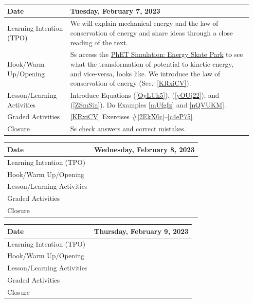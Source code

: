 \documentclass{article}
\numberwithin{equation}{section}
\numberwithin{figure}{section}
\begin{document}
\begin{tabular}{|m{}|m{}|}
    \hline  
    \cellcolor{black!20}\textbf{Date} &
    \cellcolor{black!20}\textbf{Tuesday, February 7, 2023} \\
    \hline
    Learning Intention (TPO) &  We will explain mechanical energy and the law of conservation of energy and share ideas through a close reading of the text.\\
    \hline
    Hook/Warm Up/Opening & Ss access the \href{https://phet.colorado.edu/en/simulations/energy-skate-park}{PhET Simulation: Energy Skate Park} to see what the transformation of potential to kinetic energy, and vice-versa, looks like. We introduce the \gls{law of conservation of energy} (Sec.~\ref{KRxiCV}). \\
    \hline
    Lesson/Learning Activities & Introduce Equations (\ref{QyLUh5}), (\ref{yOUj22}), and (\ref{ZSmSin}). Do Examples \ref{mUfgIz} and \ref{nQVUKM}.\\
    \hline
    Graded Activities & \ref{KRxiCV} Exercises \#\ref{2EkX0c}--\ref{c4eP75}\\
    \hline
    Closure & Ss check answers and correct mistakes.\\  
    \hline
\end{tabular} 

\begin{tabular}{|m{}|m{}|}
    \hline  
    \cellcolor{black!20}\textbf{Date} &
    \cellcolor{black!20}\textbf{Wednesday, February 8, 2023} \\
    \hline
    Learning Intention (TPO) &  \\
    \hline
    Hook/Warm Up/Opening & \\
    \hline
    Lesson/Learning Activities & \\
    \hline
    Graded Activities & \\
    \hline
    Closure & \\  
    \hline
\end{tabular} 

\begin{tabular}{|m{}|m{}|}
    \hline  
    \cellcolor{black!20}\textbf{Date} &
    \cellcolor{black!20}\textbf{Thursday, February 9, 2023} \\
    \hline
    Learning Intention (TPO) & \\
    \hline
    Hook/Warm Up/Opening & \\
    \hline
    Lesson/Learning Activities & \\
    \hline
    Graded Activities &  \\
    \hline
    Closure & \\  
    \hline
\end{tabular}
\end{document}
